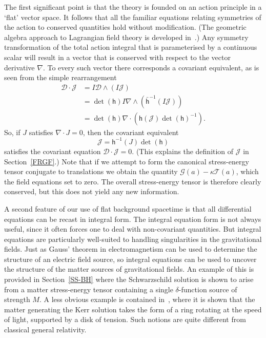 \documentclass[a4paper]{article}
\numberwithin{equation}{section}
\newcommand{\nn}{\nonumber}
\newcommand{\dt}{\! \cdot \!}
\newcommand{\wdg}{\! \wedge \!}
\newcommand{\del}{\delta}
\newcommand{\kap}{\kappa}
\newcommand{\cld}{{\mathcal{D}}}
\newcommand{\clg}{{\mathcal{G}}}
\newcommand{\clj}{{\mathcal{J}}}
\newcommand{\clt}{{\mathcal{T}}}
\newcommand{\lih}{\mathsf{h}}
\newcommand{\lbh}{\bar{\mathsf{h}}}
\newcommand{\ho}{\lbh}
\newcommand{\hu}{\lih}
\newcommand{\grad}{\nabla}
\newcommand{\dhi}{\det(\hu)^{-1}}
\renewcommand{\dh}{\det(\hu)}
\begin{document}
The first significant point is that the theory is founded on an action
principle in a `flat' vector space.  It follows that all the familiar
equations relating symmetries of the action to conserved quantities
hold without modification.  (The geometric algebra approach to
Lagrangian field theory is developed in~\cite{DGL93-lft,gap}.)  Any
symmetry transformation of the total action integral that is
parameterised by a continuous scalar will result in a vector that is
conserved with respect to the vector derivative $\grad$.  To every
such vector there corresponds a covariant equivalent, as is seen from
the simple rearrangement
%
\begin{align}
\cld \dt \clj &= I \cld \wdg (I \clj) \nn \\
&= \dh I \grad \wdg (\ho^{-1}(I \clj))  \nn \\
&= \dh \grad \dt (\hu(\clj) \dhi).
\end{align}
%
So, if $J$ satisfies $\grad\dt J=0$, then the covariant equivalent
%
\begin{equation}
\clj = \hu^{-1}(J) \dh 
\end{equation}
%
satisfies the covariant equation $\cld\dt\clj=0$.  (This explains the
definition of $\clj$ in Section~\ref{FRGF}.)  Note that if we attempt
to form the canonical stress-energy tensor conjugate to translations
we obtain the quantity $\clg(a)-\kap\clt(a)$, which the field
equations set to zero.  The overall stress-energy tensor is therefore
clearly conserved, but this does not yield any new information.


A second feature of our use of flat background spacetime is that all
differential equations can be recast in integral form.  The integral
equation form is not always useful, since it often forces one to deal
with non-covariant quantities.  But integral equations are
particularly well-suited to handling singularities in the
gravitational fields. Just as Gauss' theorem in electromagnetism can
be used to determine the structure of an electric field source, so
integral equations can be used to uncover the structure of the matter
sources of gravitational fields.  An example of this is provided in
Section~\ref{SS-BH} where the Schwarzschild solution is shown to arise
from a matter stress-energy tensor containing a single $\del$-function
source of strength $M$.  A less obvious example is contained
in~\cite{DL04-KS,DGL96-erice}, where it is shown that the matter
generating the Kerr solution takes the form of a ring rotating at the
speed of light, supported by a disk of tension.  Such notions are
quite different from classical general relativity.
\end{document}
